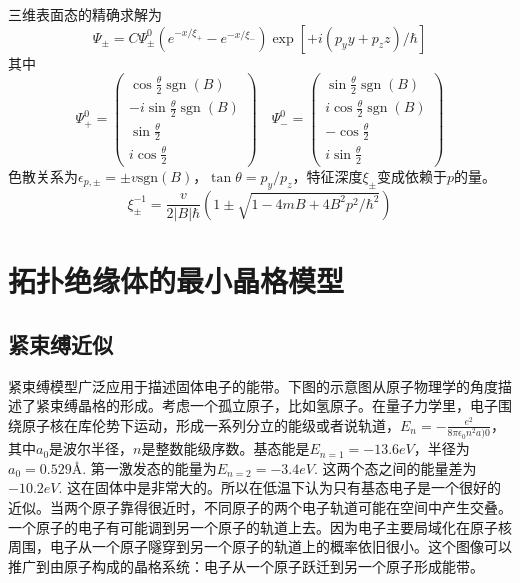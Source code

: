 \documentclass{article}
\numberwithin{equation}{subsection}
\begin{document}
三维表面态的精确求解为
\begin{equation}
    \Psi_{\pm}=C \Psi_{\pm}^{0}\left(e^{-x / \xi_{+}}-e^{-x / \xi_{-}}\right) \exp \left[+i\left(p_{y} y+p_{z} z\right) / \hbar\right]
\end{equation}
其中
\begin{equation}
    \Psi_{+}^{0}=\left(\begin{array}{c}
        \cos \frac{\theta}{2} \operatorname{sgn}(B) \\
        -i \sin \frac{\theta}{2} \operatorname{sgn}(B) \\
        \sin \frac{\theta}{2} \\
        i \cos \frac{\theta}{2}
        \end{array}\right)\quad \Psi_{-}^{0}=\left(\begin{array}{c}
            \sin \frac{\theta}{2} \operatorname{sgn}(B) \\
            i \cos \frac{\theta}{2} \operatorname{sgn}(B) \\
            -\cos \frac{\theta}{2} \\
            i \sin \frac{\theta}{2}
            \end{array}\right)
\end{equation}
色散关系为$\epsilon_{p,\pm}=\pm v\mathrm{sgn}(B)$，$\tan \theta=p_y/p_z$，特征深度$\xi_{\pm}$变成依赖于$p$的量。
\begin{equation}
    \xi_{\pm}^{-1}=\frac{v}{2|B| \hbar}(1 \pm \sqrt{1-4 m B+4 B^{2} p^{2} / \hbar^{2}})
\end{equation}
\section{拓扑绝缘体的最小晶格模型}
\subsection{紧束缚近似}
紧束缚模型广泛应用于描述固体电子的能带。下图的示意图从原子物理学的角度描述了紧束缚晶格的形成。考虑一个孤立原子，比如氢原子。在量子力学里，电子围绕原子核在库伦势下运动，形成一系列分立的能级或者说轨道，$E_n=-\frac{e^2}{8\pi\epsilon_0n^2a)0}$，其中$a_0$是波尔半径，$n$是整数能级序数。基态能是$E_{n=1}=-13.6eV$，半径为$a_0=0.529$\AA. 第一激发态的能量为$E_{n=2}=-3.4eV$. 这两个态之间的能量差为$-10.2eV$. 这在固体中是非常大的。所以在低温下认为只有基态电子是一个很好的近似。当两个原子靠得很近时，不同原子的两个电子轨道可能在空间中产生交叠。一个原子的电子有可能调到另一个原子的轨道上去。因为电子主要局域化在原子核周围，电子从一个原子隧穿到另一个原子的轨道上的概率依旧很小。这个图像可以推广到由原子构成的晶格系统：电子从一个原子跃迁到另一个原子形成能带。
\end{document}
